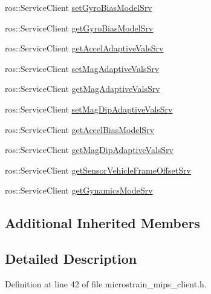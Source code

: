 \begin{DoxyCompactItemize}
\item 
ros\+::\+Service\+Client \hyperlink{classcl__microstrain__mips_1_1ClMicrostainMips_a96fa3777b87a5d8abcb0f5fe6d740934}{set\+Gyro\+Bias\+Model\+Srv}
\item 
ros\+::\+Service\+Client \hyperlink{classcl__microstrain__mips_1_1ClMicrostainMips_a4caf935b9d839aa586b562982cfc3adb}{get\+Gyro\+Bias\+Model\+Srv}
\item 
ros\+::\+Service\+Client \hyperlink{classcl__microstrain__mips_1_1ClMicrostainMips_a828f3b0adbfb1e6082fcaa1ce22928c0}{get\+Accel\+Adaptive\+Vals\+Srv}
\item 
ros\+::\+Service\+Client \hyperlink{classcl__microstrain__mips_1_1ClMicrostainMips_aeb9fb755367cd253b65bf826e421cc05}{set\+Mag\+Adaptive\+Vals\+Srv}
\item 
ros\+::\+Service\+Client \hyperlink{classcl__microstrain__mips_1_1ClMicrostainMips_a799d76ddd2e92c3624d51ffb7c4b8c89}{get\+Mag\+Adaptive\+Vals\+Srv}
\item 
ros\+::\+Service\+Client \hyperlink{classcl__microstrain__mips_1_1ClMicrostainMips_a3618b27ce1ed75f2e498c0bc6a36599d}{set\+Mag\+Dip\+Adaptive\+Vals\+Srv}
\item 
ros\+::\+Service\+Client \hyperlink{classcl__microstrain__mips_1_1ClMicrostainMips_a5516ee2ad71621f728245d0854104dc7}{get\+Accel\+Bias\+Model\+Srv}
\item 
ros\+::\+Service\+Client \hyperlink{classcl__microstrain__mips_1_1ClMicrostainMips_aa5a412d1343febccf6bda432eacb0581}{get\+Mag\+Dip\+Adaptive\+Vals\+Srv}
\item 
ros\+::\+Service\+Client \hyperlink{classcl__microstrain__mips_1_1ClMicrostainMips_a12957749416c955e1b0132cb2213f879}{get\+Sensor\+Vehicle\+Frame\+Offset\+Srv}
\item 
ros\+::\+Service\+Client \hyperlink{classcl__microstrain__mips_1_1ClMicrostainMips_a5ded1b1b3506d16e56d312b3d1a7fe13}{get\+Gynamics\+Mode\+Srv}
\end{DoxyCompactItemize}
\subsection*{Additional Inherited Members}


\subsection{Detailed Description}


Definition at line 42 of file microstrain\+\_\+mips\+\_\+client.\+h.



